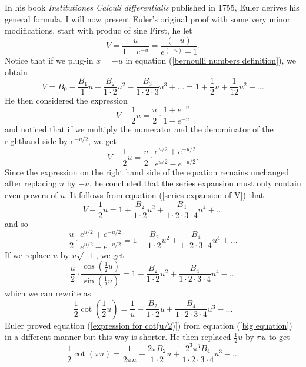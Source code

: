 In his book \textit{Institutiones Calculi differentialis} \cite{euler1755institutiones} published in 1755, Euler derives his general formula. I will now present Euler's original proof with some very minor modifications. \td start with produc of sine \td First, he let
\begin{equation}
    V = \frac{u}{1 - e^{-u}} = \frac{(-u)}{e^{(-u)} - 1}.
\end{equation}
Notice that if we plug-in $x = -u$ in equation (\ref{bernoulli numbers definition}), we obtain
\begin{equation} \label{series expansion of V}
    V = B_0 - \frac{B_1}{1}u + \frac{B_2}{1\cdot 2}u^2 - \frac{B_3}{1\cdot 2 \cdot 3}u^3 + \dots = 1 + \frac{1}{2}u + \frac{1}{12}u^2 + \dots
\end{equation}
He then considered the expression
$$V - \frac{1}{2}u = \frac{u}{2} \cdot \frac{1 + e^{-u}}{1 - e^{-u}}$$
and noticed that if we multiply the numerator and the denominator of the righthand side by $e^{-u/2}$, we get
\begin{equation}
    V - \frac{1}{2}u = \frac{u}{2}\cdot \frac{e^{u/2} + e^{-u/2}}{e^{u/2} - e^{-u/2}}.
\end{equation}
Since the expression on the right hand side of the equation remains unchanged after replacing $u$ by $-u$, he concluded that the series expansion must only contain even powers of $u$. It follows from equation (\ref{series expansion of V}) that 
$$V - \frac{1}{2}u = 1 + \frac{B_2}{1\cdot 2}u^2 + \frac{B_4}{1\cdot 2 \cdot 3 \cdot 4}u^4 + ... $$
and so 
\begin{equation} \label{big equation}
    \frac{u}{2}\cdot \frac{e^{u/2} + e^{-u/2}}{e^{u/2} - e^{-u/2}} = 1 + \frac{B_2}{1\cdot 2}u^2 + \frac{B_4}{1\cdot 2 \cdot 3 \cdot 4}u^4 + ... 
\end{equation}
If we replace $u$ by $u\sqrt{-1}$, we get
$$\frac{u}{2} \cdot \frac{\cos(\frac{1}{2}u)}{\sin(\frac{1}{2}u)} = 1 - \frac{B_2}{1\cdot 2}u^2 + \frac{B_4}{1\cdot 2 \cdot 3 \cdot 4}u^4 - ... $$
which we can rewrite as
\begin{equation} \label{expression for cot(u/2)}
    \frac{1}{2}\cot\left(\frac{1}{2}u\right) = \frac{1}{u} - \frac{B_2}{1\cdot 2}u + \frac{B_4}{1\cdot 2 \cdot 3 \cdot 4}u^3 - ...
\end{equation}
Euler proved equation (\ref{expression for cot(u/2)}) from equation (\ref{big equation}) in a different manner but this way is shorter. He then replaced $\frac{1}{2}u$ by $\pi u$ to get
$$\frac{1}{2}\cot(\pi u) = \frac{1}{2\pi u} - \frac{2 \pi B_2}{1\cdot 2}u + \frac{2^3 \pi^3 B_4}{1\cdot 2 \cdot 3 \cdot 4}u^3 - ...$$
